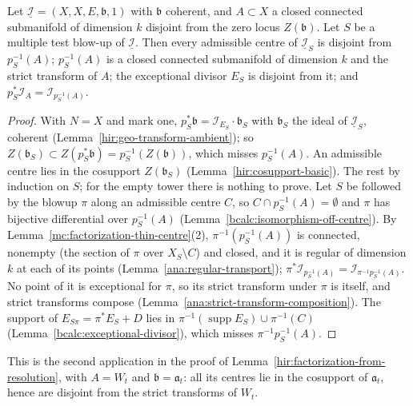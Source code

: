 \begin{lemma}
\label{mc:factorization-second}
\leanok
Let \(\underline{\mathcal I}=(X,X,E,\mathfrak b,1)\) with \(\mathfrak b\) coherent, and \(A\subset X\) a closed connected submanifold of dimension \(k\) disjoint from the zero
locus \(Z(\mathfrak b)\). Let \(S\) be a multiple test blow-up of \(\underline{\mathcal I}\). Then every admissible centre of \(\underline{\mathcal I}_S\) is disjoint from
\(p_S^{-1}(A)\); \(p_S^{-1}(A)\) is a closed connected submanifold of dimension \(k\) and the strict transform of \(A\); the exceptional divisor \(E_S\) is disjoint from it; and
\(p_S^*\mathcal I_A=\mathcal I_{p_S^{-1}(A)}\).
\end{lemma}
\begin{proof}
\leanok
With \(N=X\) and mark one, \(p_S^*\mathfrak b=\mathcal I_{E_S}\cdot\mathfrak b_S\) with \(\mathfrak b_S\) the ideal of \(\underline{\mathcal I}_S\), coherent (Lemma~\ref{hir:geo-transform-ambient}); so
\(Z(\mathfrak b_S)\subset Z(p_S^*\mathfrak b)=p_S^{-1}(Z(\mathfrak b))\), which misses \(p_S^{-1}(A)\). An admissible centre lies in the cosupport \(Z(\mathfrak b_S)\)
(Lemma~\ref{hir:cosupport-basic}). The rest by induction on \(S\); for the empty tower there is nothing to prove. Let \(S\) be followed by the blowup \(\pi\) along an
admissible centre \(C\), so \(C\cap p_S^{-1}(A)=\emptyset\) and \(\pi\) has bijective differential over \(p_S^{-1}(A)\) (Lemma~\ref{bcalc:isomorphism-off-centre}). By
Lemma~\ref{mc:factorization-thin-centre}(2), \(\pi^{-1}(p_S^{-1}(A))\) is connected, nonempty (the section of \(\pi\) over \(X_S\setminus C\)) and closed, and it is regular of
dimension \(k\) at each of its points (Lemma~\ref{ana:regular-transport}); \(\pi^*\mathcal I_{p_S^{-1}(A)}=\mathcal I_{\pi^{-1}p_S^{-1}(A)}\). No point of it is exceptional for \(\pi\), so
its strict transform under \(\pi\) is itself, and strict transforms compose (Lemma~\ref{ana:strict-transform-composition}). The support of \(E_{S\pi}=\pi^*E_S+D\) lies in
\(\pi^{-1}(\operatorname{supp}E_S)\cup\pi^{-1}(C)\) (Lemma~\ref{bcalc:exceptional-divisor}), which misses \(\pi^{-1}p_S^{-1}(A)\).
\end{proof}
This is the second application in the proof of Lemma~\ref{hir:factorization-from-resolution}, with \(A=W_t\) and \(\mathfrak b=\mathfrak a_t\): all its centres lie in the cosupport
of \(\mathfrak a_t\), hence are disjoint from the strict transforms of \(W_t\).

